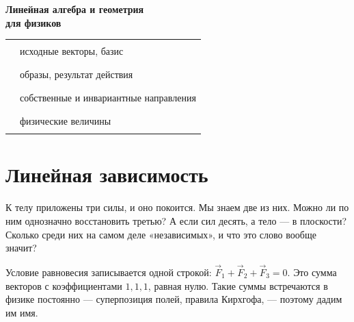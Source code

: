 \documentclass[12pt,a4paper]{report}
\begin{document}
\begin{titlepage}\centering\sffamily
\vspace*{3cm}
{\Huge\bfseries\color{cBase} Линейная алгебра и геометрия\\[0.3em] для физиков\par}
\vspace{1em}{\Large методическое пособие для студентов-физиков\par}
\vspace{2.5cm}
\vfill
\begin{tabular}{rl}
\textcolor{cBase}{\rule{1.2em}{0.6em}} & исходные векторы, базис\\
\textcolor{cImage}{\rule{1.2em}{0.6em}} & образы, результат действия\\
\textcolor{cEigen}{\rule{1.2em}{0.6em}} & собственные и инвариантные направления\\
\textcolor{cPhys}{\rule{1.2em}{0.6em}} & физические величины
\end{tabular}
\vspace{1cm}
\end{titlepage}

\tableofcontents

\chapter{Линейная зависимость}

\begin{problem}
К телу приложены три силы, и оно покоится. Мы знаем две из них. Можно ли
по ним однозначно восстановить третью? А если сил десять, а тело — в плоскости?
Сколько среди них на самом деле «независимых», и что это слово вообще значит?
\end{problem}

Условие равновесия записывается одной строкой: $\vec F_1+\vec F_2+\vec F_3=0$.
Это сумма векторов с коэффициентами $1,1,1$, равная нулю. Такие суммы
встречаются в физике постоянно — суперпозиция полей, правила Кирхгофа, —
поэтому дадим им имя.
\end{document}
